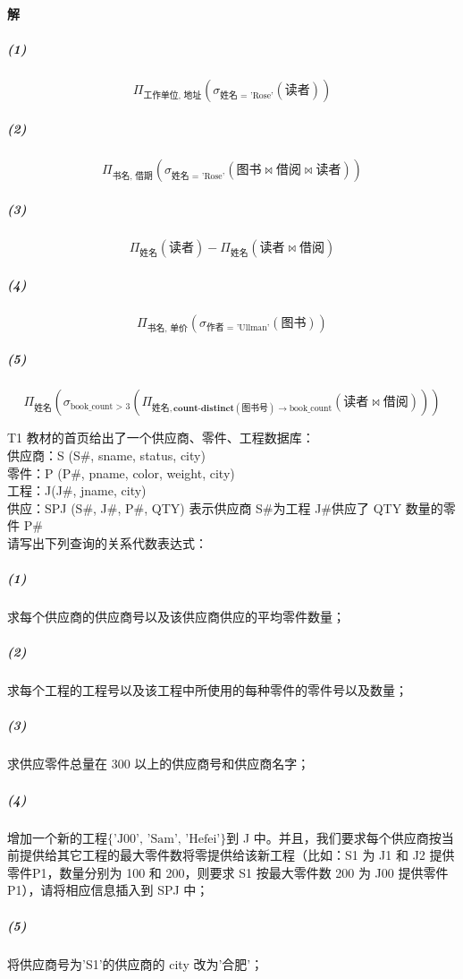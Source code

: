 \documentclass{article}
\makeatletter
\renewcommand{\section}{\@startsection{section}{1}{0mm}
                                {-5ex plus -.5ex minus -.2ex}
                                {3ex plus .2ex}
                                {\normalfont\large\bfseries}}
\makeatother
\begin{document}
\paragraph{解}
\subparagraph{(1)}
\begin{equation*}
    \Pi_{\text{工作单位, 地址}}(\sigma_{\text{姓名 = 'Rose'}}(\text{读者}))
\end{equation*}
\subparagraph{(2)}
\begin{equation*}
    \Pi_{\text{书名, 借期}}(\sigma_{\text{姓名 = 'Rose'}}(\text{图书} \Join \text{借阅} \Join \text{读者}))
\end{equation*}
\subparagraph{(3)}
\begin{equation*}
    \Pi_{\text{姓名}}(\text{读者}) - \Pi_{\text{姓名}}(\text{读者} \Join \text{借阅})
\end{equation*}
\subparagraph{(4)}
\begin{equation*}
    \Pi_{\text{书名, 单价}}(\sigma_{\text{作者 = 'Ullman'}}(\text{图书}))
\end{equation*}
\subparagraph{(5)}
\begin{equation*}
    \Pi_{\text{姓名}}(\sigma_{\text{book\_count > 3}}(\Pi_{\text{姓名}, \textbf{count-distinct}(\text{图书号}) \rightarrow \text{book\_count}}(\text{读者} \Join \text{借阅})))
\end{equation*}

\section{T1 教材的首页给出了一个供应商、零件、工程数据库：
\protect\\ \indent 供应商：S (S\#, sname, status, city)
\protect\\ \indent 零件：P (P\#, pname, color, weight, city)
\protect\\ \indent 工程：J(J\#, jname, city)
\protect\\ \indent 供应：SPJ (S\#, J\#, P\#, QTY) 表示供应商 S\#为工程 J\#供应了 QTY 数量的零件 P\#
\protect\\ 请写出下列查询的关系代数表达式：}
\subparagraph{(1)} 求每个供应商的供应商号以及该供应商供应的平均零件数量；
\subparagraph{(2)} 求每个工程的工程号以及该工程中所使用的每种零件的零件号以及数量；
\subparagraph{(3)} 求供应零件总量在 300 以上的供应商号和供应商名字；
\subparagraph{(4)} 增加一个新的工程$\{\text{'J00'},\, \text{'Sam'},\, \text{'Hefei'}\}$到 J 中。并且，我们要求每个供应商按当前提供给其它工程的最大零件数将零提供给该新工程（比如：S1 为 J1 和 J2 提供零件P1，数量分别为 100 和 200，则要求 S1 按最大零件数 200 为 J00 提供零件 P1），请将相应信息插入到 SPJ 中；
\subparagraph{(5)} 将供应商号为'S1'的供应商的 city 改为'合肥'；
\end{document}
